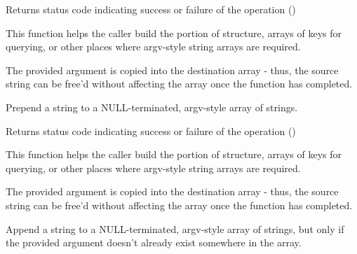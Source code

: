 Returns status code indicating success or failure of the operation ()

This function helps the caller build the  portion of  structure, arrays of keys for querying, or other places where argv-style string arrays are required.

\adviceuserstart
The provided argument is copied into the destination array - thus, the source string can be free'd without affecting the array once the function has completed.
\adviceuserend


Prepend a string to a NULL-terminated, argv-style array of strings.


\begin{arglist}
\end{arglist}

Returns status code indicating success or failure of the operation ()

\descr
This function helps the caller build the  portion of  structure, arrays of keys for querying, or other places where argv-style string arrays are required.

\adviceuserstart
The provided argument is copied into the destination array - thus, the source string can be free'd without affecting the array once the function has completed.
\adviceuserend


Append a string to a NULL-terminated, argv-style array of strings, but only if the provided argument doesn't already exist somewhere in the array.


